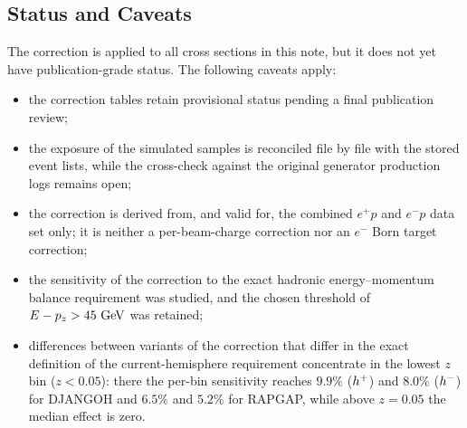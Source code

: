 \subsection{Status and Caveats}
\label{sec:radiative_corrections:caveats}

The correction is applied to all cross sections in this note, but it does not
yet have publication-grade status.  The following caveats apply:
\begin{itemize}
  \item the correction tables retain provisional status pending a final
        publication review;
  \item the exposure of the simulated samples is reconciled file by file with
        the stored event lists, while the cross-check against the original
        generator production logs remains open;
  \item the correction is derived from, and valid for, the combined
        $e^{+}p$ and $e^{-}p$ data set only; it is neither a per-beam-charge
        correction nor an $e^{-}$ Born target correction;
  \item the sensitivity of the correction to the exact hadronic
        energy--momentum balance requirement was studied, and the chosen
        threshold of $E-p_z>45~\text{GeV}$ was retained;
  \item differences between variants of the correction that differ in the
        exact definition of the current-hemisphere requirement concentrate
        in the lowest $z$ bin ($z<0.05$): there the per-bin sensitivity
        reaches $9.9\%$ ($h^{+}$) and $8.0\%$ ($h^{-}$) for DJANGOH
        and $6.5\%$ and $5.2\%$ for RAPGAP, while above $z=0.05$ the
        median effect is zero.
\end{itemize}

%

